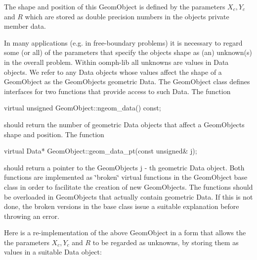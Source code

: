 The shape and position of this {\ttfamily Geom\+Object} is defined by the parameters $ X_c, Y_c $ and $ R $ which are stored as double precision numbers in the object\textquotesingle{}s private member data.

In many applications (e.\+g. in free-\/boundary problems) it is necessary to regard some (or all) of the parameters that specify the object\textquotesingle{}s shape as (an) unknown(s) in the overall problem. Within {\ttfamily oomph-\/lib} all unknowns are values in {\ttfamily Data} objects. We refer to any {\ttfamily Data} objects whose values affect the shape of a {\ttfamily Geom\+Object} as the {\ttfamily Geom\+Object\textquotesingle{}s} geometric {\ttfamily Data}. The {\ttfamily Geom\+Object} class defines interfaces for two functions that provide access to such {\ttfamily Data}. The function


\begin{DoxyCode}
\textcolor{keyword}{virtual} \textcolor{keywordtype}{unsigned} GeomObject::ngeom\_data() \textcolor{keyword}{const};
\end{DoxyCode}


should return the number of geometric {\ttfamily Data} objects that affect a {\ttfamily Geom\+Object\textquotesingle{}s} shape and position. The function


\begin{DoxyCode}
\textcolor{keyword}{virtual} Data* GeomObject::geom\_data\_pt(\textcolor{keyword}{const} \textcolor{keywordtype}{unsigned}& j);
\end{DoxyCode}


should return a pointer to the {\ttfamily Geom\+Object\textquotesingle{}s} {\ttfamily j} -\/ th geometric {\ttfamily Data} object. Both functions are implemented as \char`\"{}broken\char`\"{} virtual functions in the {\ttfamily Geom\+Object} base class in order to facilitate the creation of new {\ttfamily Geom\+Objects}. The functions should be overloaded in {\ttfamily Geom\+Objects} that actually contain geometric {\ttfamily Data}. If this is not done, the broken versions in the base class issue a suitable explanation before throwing an error.

Here is a re-\/implementation of the above {\ttfamily Geom\+Object} in a form that allows the the parameters $ X_c, Y_c $ and $ R $ to be regarded as unknowns, by storing them as values in a suitable {\ttfamily Data} object\+:


